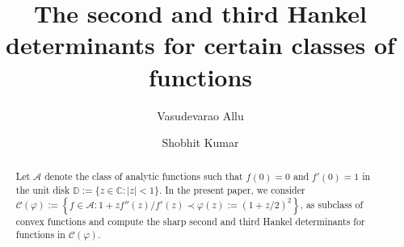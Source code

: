 \documentclass[a4paper,12pt,reqno]{amsart} %
\numberwithin{equation}{section}
\theoremstyle{definition}
\begin{document}
\title{{The second and third Hankel determinants for certain classes of functions}}

\author{Vasudevarao Allu}
\address{Vasudevarao Allu,
Department of Mathematics,
School of Basic Sciences,
Indian Institute of Technology Bhubaneswar,
Bhubaneswar-752050, Odisha, India.}

\author{Shobhit Kumar}
\address{Shobhit Kumar,
Department of Mathematics,
School of Basic Sciences,
Indian Institute of Technology Bhubaneswar,
Bhubaneswar-752050, Odisha, India.}



\def\thefootnote{}
\footnotetext{
{ }
}
\makeatletter\def\thefootnote{\@arabic\c@footnote}\makeatother
\begin{abstract}
Let $\mathcal{A}$ denote the class of analytic functions such that $f(0)=0$ and $f'(0)=1$ in the unit disk $\mathbb{D}:=\{z \in \mathbb{C}: |z|<1\}.$
In the present paper, we consider  $\mathcal{C}(\varphi) := \left\{ f \in \mathcal{A} : 1+zf''(z)/f'(z) \prec \varphi(z):=(1+z/2)^2 \right\}$, as subclass of convex functions and  compute the sharp second and third Hankel determinants for functions in $\mathcal{C}(\varphi)$. 
\end{abstract}
\maketitle
{}
\setcounter{page}{1}
\end{document}
